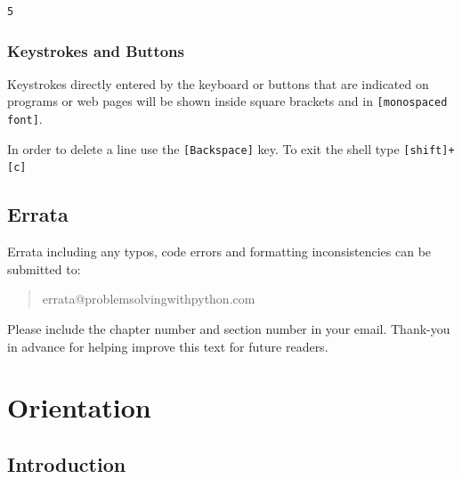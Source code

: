 \documentclass{book}
\begin{document}
    \begin{Verbatim}[commandchars=\\\{\}]
5

    \end{Verbatim}


    
        \subsection{Keystrokes and Buttons}\label{keystrokes-and-buttons}

Keystrokes directly entered by the keyboard or buttons that are
indicated on programs or web pages will be shown inside square brackets
and in \lstinline![monospaced font]!.

In order to delete a line use the \lstinline![Backspace]! key. To exit
the shell type \lstinline![shift]+[c]!
    




    
        \section{Errata}\label{errata}
    




    
        Errata including any typos, code errors and formatting inconsistencies
can be submitted to:

\begin{quote}
errata@problemsolvingwithpython.com
\end{quote}

Please include the chapter number and section number in your email.
Thank-you in advance for helping improve this text for future readers.
    




    
        \chapter{Orientation}\label{orientation}
    




    
        \section{Introduction}\label{introduction}
    
\end{document}
